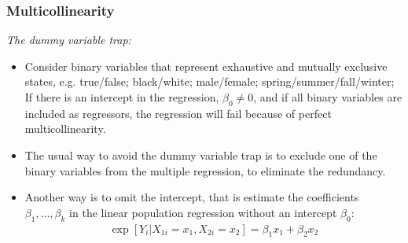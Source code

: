 

\begin{frame}
\frametitle{Multicollinearity}
\emph{The dummy variable trap:}
\begin{itemize} 
\item Consider binary variables that represent exhaustive and mutually exclusive states, e.g. true/false; black/white; male/female; spring/summer/fall/winter; If there is an intercept in the regression, $\beta_{0}\neq 0$, and if all binary variables are included as regressors, the regression will fail because of perfect multicollinearity.
\item The usual way to avoid the dummy variable trap is to exclude one of the binary variables from the multiple regression, to eliminate the redundancy. 
\item Another way is to omit the intercept, that is estimate the coefficients $\beta_{1},\ldots,\beta_{k}$ in the linear population regression without an intercept $\beta_{0}$:
\begin{align*}
\exp[Y_{i}|X_{1i}=x_{1}, X_{2i}=x_{2}] 
    = \beta_{1} x_{1} + \beta_{2} x_{2}
\end{align*}
\end{itemize}
\end{frame}


